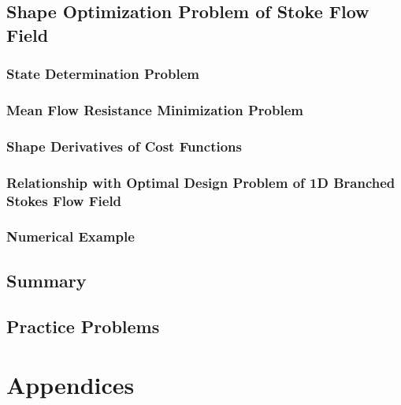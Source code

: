 \documentclass[oneside]{book}
\numberwithin{equation}{section}
\begin{document}
\subsection{Shape Optimization Problem of Stoke Flow Field}

\subsubsection{State Determination Problem}

\subsubsection{Mean Flow Resistance Minimization Problem}

\subsubsection{Shape Derivatives of Cost Functions}

\subsubsection{Relationship with Optimal Design Problem of 1D Branched Stokes Flow Field}

\subsubsection{Numerical Example}

\subsection{Summary}

\subsection{Practice Problems}


\section{Appendices}


\printbibliography[heading=bibintoc]
	
\end{document}

